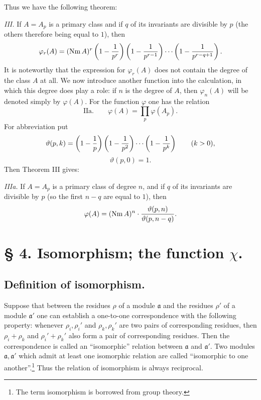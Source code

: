 \documentclass[11pt,a4paper]{article}
\newcommand{\Nm}{\operatorname{Nm}}
\newcommand{\tht}{\vartheta}
\begin{document}
Thus we have the following theorem:

\emph{III.} If $A=A_p$ is a primary class and if $q$ of its invariants are divisible by $p$ (the others therefore being equal to $1$), then
\[
 \varphi_r(A)=(\Nm A)^r
 \left(1-{1\over p^r}\right)
 \left(1-{1\over p^{r-1}}\right)
 \cdots
 \left(1-{1\over p^{r-q+1}}\right).
\]
It is noteworthy that the expression for $\varphi_r(A)$ does not contain the degree of the class $A$ at all. We now introduce another function into the calculation, in which this degree does play a role: if $n$ is the degree of $A$, then $\varphi_n(A)$ will be denoted simply by $\varphi(A)$. For the function $\varphi$ one has the relation
\[
\text{IIa.}\qquad
 \varphi(A)=\prod_p \varphi(A_p).
\]
For abbreviation put
\[
 \tht(p,k)=\left(1-{1\over p}\right)
 \left(1-{1\over p^2}\right)\cdots
 \left(1-{1\over p^k}\right)\qquad (k>0),
\]
\[
 \tht(p,0)=1.
\]
Then Theorem III gives:

\emph{IIIa.} If $A=A_p$ is a primary class of degree $n$, and if $q$ of its invariants are divisible by $p$ (so the first $n-q$ are equal to $1$), then
\[
 \varphi(A)=(\Nm A)^n\cdot {\tht(p,n)\over \tht(p,n-q)}.
\]


\section*{§ 4. Isomorphism; the function $\chi$.}

\subsection*{Definition of isomorphism.}

Suppose that between the residues $\rho$ of a module $\mathfrak a$ and the residues $\rho'$ of a module $\mathfrak a'$ one can establish a one-to-one correspondence with the following property: whenever $\rho_i,\rho_i'$ and $\rho_k,\rho_k'$ are two pairs of corresponding residues, then $\rho_i+\rho_k$ and $\rho_i'+\rho_k'$ also form a pair of corresponding residues. Then the correspondence is called an ``isomorphic'' relation between $\mathfrak a$ and $\mathfrak a'$. Two modules $\mathfrak a,\mathfrak a'$ which admit at least one isomorphic relation are called ``isomorphic to one another''.\footnote{The term isomorphism is borrowed from group theory.} Thus the relation of isomorphism is always reciprocal.
\end{document}
